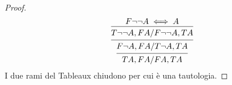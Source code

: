 \begin{proof}
\begin{equation*}
\begin{prooftree}
\hypo{F \neg \neg A \iff A}
\infer1 {T \neg \neg A,FA/F \neg \neg A,TA}
\infer1 {F \neg A,FA/T \neg A,TA}
\infer1 {TA,FA/FA,TA}
\end{prooftree}
\end{equation*}
I due rami del Tableaux chiudono per cui è una tautologia.
\end{proof}
